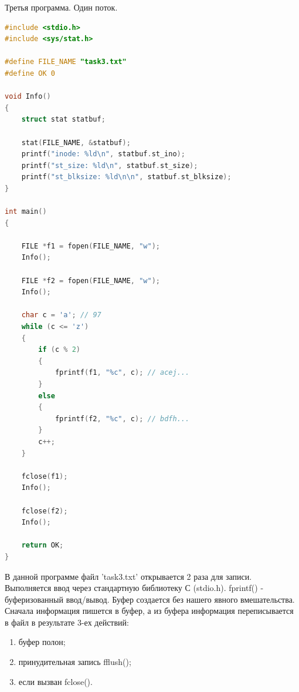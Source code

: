 \documentclass[a4paper,oneside,12pt]{extreport}
\begin{document}
\begin{task}
    Третья программа. Один поток.

    \begin{lstlisting}[language=C]
#include <stdio.h>
#include <sys/stat.h>

#define FILE_NAME "task3.txt"
#define OK 0

void Info()
{
    struct stat statbuf;

    stat(FILE_NAME, &statbuf);
    printf("inode: %ld\n", statbuf.st_ino);
    printf("st_size: %ld\n", statbuf.st_size);
    printf("st_blksize: %ld\n\n", statbuf.st_blksize);
}

int main()
{

    FILE *f1 = fopen(FILE_NAME, "w");
    Info();

    FILE *f2 = fopen(FILE_NAME, "w");
    Info();

    char c = 'a'; // 97
    while (c <= 'z')
    {
        if (c % 2)
        {
            fprintf(f1, "%c", c); // acej...
        }
        else
        {
            fprintf(f2, "%c", c); // bdfh...
        }
        c++;
    }

    fclose(f1);
    Info();

    fclose(f2);
    Info();

    return OK;
}
    \end{lstlisting}

    В данной программе файл 'task3.txt' открывается 2 раза для записи.
    Выполняется ввод через стандартную библиотеку С (stdio.h). 
    fprintf() - буферизованный ввод/вывод. 
    Буфер создается без нашего явного вмешательства.
    Сначала информация пишется в буфер, а из буфера информация 
    переписывается в файл в результате 3-ех действий:
    \begin{enumerate}
        \item буфер полон;
        \item принудительная запись fflush();
        \item если вызван fclose().
    \end{enumerate}   

    \begin{figure}[ht!]
    \end{figure}


\end{task}
\end{document}
